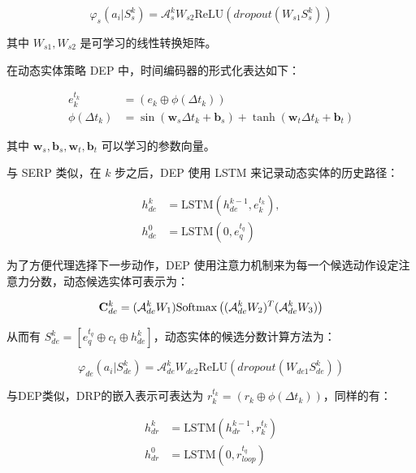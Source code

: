 \documentclass[a4paper, AutoFakeBold]{article}
\begin{document}
\begin{equation}
\varphi_s(a_i|S^k_s)={\mathcal A}_s^k W_{s2}\text{ReLU}(dropout(W_{s1}S^k_s))
\end{equation}

其中 $W_{s1},W_{s2}$ 是可学习的线性转换矩阵。

在动态实体策略 DEP 中，时间编码器的形式化表达如下：

\begin{equation}
	\begin{aligned}
e_k^{t_k} & =(e_k\oplus\phi(\Delta t_k)) \\ 
\phi(\Delta t_k) & =\sin({\boldsymbol w}_s\Delta t_k+{\boldsymbol b}_s)+\tanh({\boldsymbol w}_t\Delta t_k+{\boldsymbol b}_t)
	\end{aligned}
\end{equation}

其中 ${\boldsymbol w}_s,{\boldsymbol b}_s,{\boldsymbol w}_t,{\boldsymbol b}_t$ 可以学习的参数向量。

与 SERP 类似，在 $k$ 步之后，DEP 使用 LSTM 来记录动态实体的历史路径：

\begin{equation}
	\begin{aligned}
h^k_{de} & =\text{LSTM}(h_{de}^{k-1},e_k^{t_k}), \\ 
h^0_{de} & =\text{LSTM}(0,e_q^{t_q})
	\end{aligned}
\end{equation}

为了方便代理选择下一步动作，DEP 使用注意力机制来为每一个候选动作设定注意力分数，动态候选实体可表示为：

\begin{equation}
{\bold C}^k_{de}=({\mathcal A}^k_{de}W_1)\text{Softmax}\left(({\mathcal A}^k_{de}W_2)^T({\mathcal A}^k_{de}W_3)\right)
\end{equation}

从而有 $S_{de}^k=[e_q^{t_q}\oplus c_t \oplus h^k_{de}]$，动态实体的候选分数计算方法为：

\begin{equation}
\varphi_{de}(a_i|S^k_{de})={\mathcal A}_{de}^k W_{de2}\text{ReLU}(dropout(W_{de1}S^k_{de}))
\end{equation}

与DEP类似，DRP的嵌入表示可表达为 $r_k^{t_k}=(r_k\oplus\phi(\Delta t_k))$，同样的有：

\begin{equation}
	\begin{aligned}
h^k_{dr} & =\text{LSTM}(h_{dr}^{k-1},r_k^{t_k}) \\ 
h^0_{dr} & =\text{LSTM}(0,r_{loop}^{t_q})
	\end{aligned}
\end{equation}
\end{document}
